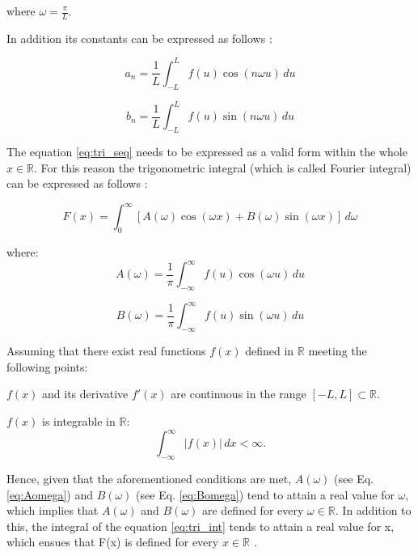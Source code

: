 {{where \( \omega = \frac{\pi}{L} \).

In addition its constants can be expressed as follows \cite{diff_eq}:

\begin{equation}
    a_n = \frac{1}{L} \int_{-L}^{L} f(u) \cos(n \omega u) \,du   
\end{equation}

\begin{equation}
    b_n = \frac{1}{L} \int_{-L}^{L} f(u) \sin(n \omega u) \,du    
\end{equation}

The equation \eqref{eq:tri_seq} needs to be expressed as a valid form within the whole \( x \in \mathbb{R} \). For this reason the  trigonometric integral (which is called Fourier integral) can be expressed as follows \cite{diff_eq}: 

\begin{equation}
    F(x) = \int_0^{\infty} \left[ A(\omega) \cos(\omega x) + B(\omega) \sin(\omega x) \right] \, d\omega
    \label{eq:tri_int}
\end{equation}

where: 
\begin{equation}
    A(\omega) = \frac{1}{\pi} \int_{-\infty}^{\infty} f(u) \cos(\omega u) \,du
    \label{eq:Aomega}
\end{equation}

\begin{equation}
    B(\omega) = \frac{1}{\pi} \int_{-\infty}^{\infty} f(u) \sin(\omega u) \,du
    \label{eq:Bomega}
\end{equation}

Assuming that there exist real functions \( f(x) \) defined in \( \mathbb{R} \) meeting the following points: 
\begin{itemize}
{
    \item \( f(x) \) and its derivative \( f'(x) \) are continuous in the range \( [-L, L] \subset \mathbb{R} \).
    \item \( f(x) \) is integrable in \( \mathbb{R} \):
	\[
    \int_{-\infty}^{\infty} |f(x)| \,dx < \infty.
    \]
}
\end{itemize}

Hence, given that the aforementioned conditions are met, \( A(\omega) \) (see Eq. \eqref{eq:Aomega}) and \( B(\omega) \) (see Eq. \eqref{eq:Bomega}) tend to attain a real value for \( \omega \), which implies that \( A(\omega) \) and \( B(\omega) \) are defined for every \( \omega \in \mathbb{R} \). In addition to this, the integral of the equation \eqref{eq:tri_int} tends to attain a real value for x, which ensues that F(x) is defined for every \( x \in \mathbb{R} \)  \cite{diff_eq}.

}}
